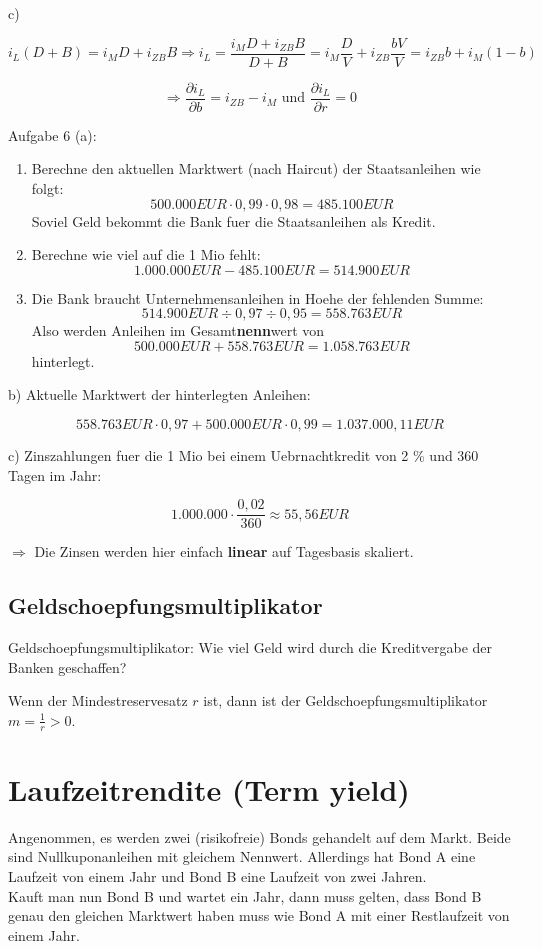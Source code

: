 \documentclass[a4paper]{article}
\begin{document}
c)

\[
	i_L \left(
	D + B
	\right) =
	i_M D + i_{ZB} B \Rightarrow
	i_L = \frac{ i_M D + i_{ZB} B }{ D + B } =
	i_M \frac{ D }{ V } + i_{ZB} \frac{ bV }{ V } =
	i_{ZB} b + i_M (1 - b)
\]

\[
	\Rightarrow \frac{ \partial i_L }{ \partial b } =
	i_{ZB} - i_M \text{ und }
	\frac{ \partial i_L }{ \partial r } = 0
\]

Aufgabe 6 (a):

\begin{enumerate}
	\item Berechne den aktuellen Marktwert (nach Haircut) der Staatsanleihen wie folgt:
	      \[
		      500.000 EUR \cdot 0,99 \cdot 0,98 = 485.100 EUR
	      \]
	      Soviel Geld bekommt die Bank fuer die Staatsanleihen als Kredit.
	\item Berechne wie viel auf die 1 Mio fehlt:
	      \[
		      1.000.000 EUR - 485.100 EUR = 514.900 EUR
	      \]
	\item Die Bank braucht Unternehmensanleihen in Hoehe der fehlenden Summe:
	      \[
		      514.900 EUR \div 0,97 \div 0,95 = 558.763 EUR
	      \]
	      Also werden Anleihen im Gesamt\textbf{nenn}wert von
	      \[
		      500.000 EUR + 558.763 EUR = 1.058.763 EUR
	      \]
	      hinterlegt.
\end{enumerate}

b) Aktuelle Marktwert der hinterlegten Anleihen:

\[
	558.763 EUR \cdot 0,97 + 500.000 EUR \cdot 0,99 = 1.037.000,11 EUR
\]

c) Zinszahlungen fuer die 1 Mio bei einem Uebrnachtkredit von 2 \% und 360 Tagen
im Jahr:

\[
	1.000.000 \cdot \frac{ 0,02 }{ 360 } \approx 55,56 EUR
\]

$\Rightarrow$ Die Zinsen werden hier einfach \textbf{linear} auf Tagesbasis skaliert.

\subsection{Geldschoepfungsmultiplikator}

Geldschoepfungsmultiplikator: Wie viel Geld wird durch die
Kreditvergabe der Banken geschaffen?

Wenn der Mindestreservesatz $r$ ist, dann ist der Geldschoepfungsmultiplikator $m = \frac{1}{r} > 0$.

\section{Laufzeitrendite (Term yield)}

Angenommen, es werden zwei (risikofreie) Bonds gehandelt auf dem Markt. Beide sind
Nullkuponanleihen mit gleichem Nennwert. Allerdings hat Bond A eine Laufzeit von
einem Jahr und Bond B eine Laufzeit von zwei Jahren. \\

Kauft man nun Bond B und wartet ein Jahr, dann muss gelten, dass Bond B genau
den gleichen Marktwert haben muss wie Bond A mit einer Restlaufzeit von einem Jahr.
\end{document}
